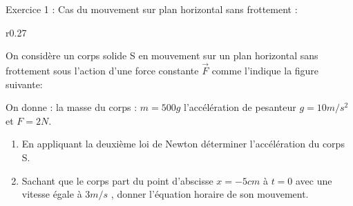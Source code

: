 \documentclass[12pt, french]{article}
\begin{document}
\begin{center}

\end{center}

\vspace{-0.2cm}
   \begin{Box2}{Exercice 1 : Cas du mouvement sur plan horizontal sans frottement : }

 
 
 
 
\begin{wrapfigure}{r}{0.27\textwidth}
	\vspace{-0.6cm}

\end{wrapfigure}
On considère un corps solide S en mouvement sur un plan horizontal sans frottement sous l'action d'une force constante $\vec{F}$
comme l'indique la figure suivante:

On donne : la masse du corps : $m=500g$ l’accélération de pesanteur $g=10 m/s^2$ et $F=2N$.
\begin{enumerate}
	\item  En appliquant la deuxième loi de Newton déterminer l'accélération du corps S.
	\item  Sachant que le corps part du point d'abscisse $x =-5cm$ à $t=0$ avec une vitesse égale à $3m/s$ , donner l'équation horaire de son
mouvement.
\end{enumerate}
   \end{Box2}
\end{document}
